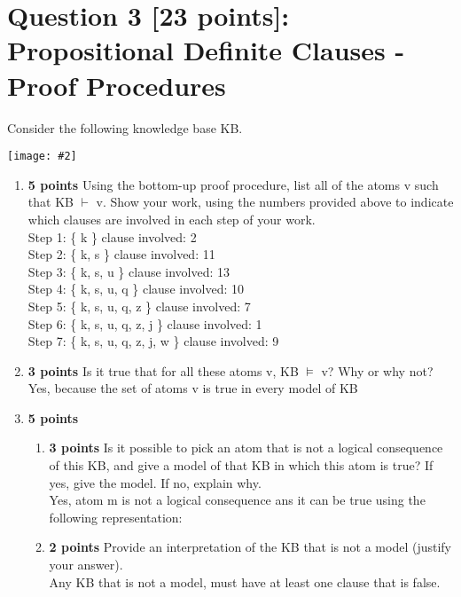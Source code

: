 \documentclass{article}
\def\ans#1{{\color{ans}#1}}
\newcommand{\centerfig}[2]{\begin{center}\texttt{[image: \#2]}\end{center}}
\begin{document}
\section{Question 3 [23 points]: Propositional Definite Clauses - Proof Procedures}
Consider the following knowledge base KB.
\centerfig{0.2}{../figs/fig2}
\begin{enumerate}[label=(\alph*)]
    \item \textbf{5 points} Using the bottom-up proof procedure, list all of the atoms v such that KB $\vdash$ v. Show your work, using the numbers provided above to indicate which clauses are involved in each step of your work.\\
        \ans{
            Step 1:  \{ k \}  clause involved: 2 \\
            Step 2:  \{ k, s \}  clause involved: 11 \\
            Step 3:  \{ k, s, u \}  clause involved: 13 \\
            Step 4:  \{ k, s, u, q \}  clause involved: 10 \\
            Step 5:  \{ k, s, u, q, z \}  clause involved: 7 \\
            Step 6:  \{ k, s, u, q, z, j \}  clause involved: 1 \\
            Step 7:  \{ k, s, u, q, z, j, w \}  clause involved: 9 
        }
    \item \textbf{3 points} Is it true that for all these atoms v, KB $\vDash$ v? Why or why not?\\
        \ans{
          Yes, because the set of atoms v is true in every model of KB
        }
    \item \textbf{5 points}\\
    \begin{enumerate}[label=\roman*.]
        \item \textbf{3 points} Is it possible to pick an atom that is not a logical consequence of this KB, and give a model of that KB in which this atom is true? If yes, give the model. If no, explain why.\\
        \ans{
            Yes, atom m is not a logical consequence ans it can be true using the following representation:
        }
        \item \textbf{2 points} Provide an interpretation of the KB that is not a model (justify your answer).\\
        \ans{
            Any KB that is not a model, must have at least one clause that is false.
}
\end{enumerate}
\end{enumerate}
\end{document}
